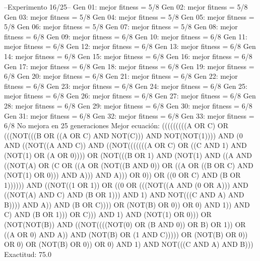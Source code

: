 --Experimento 
 16/25--
Gen 01: mejor fitness = 5/8
Gen 02: mejor fitness = 5/8
Gen 03: mejor fitness = 5/8
Gen 04: mejor fitness = 5/8
Gen 05: mejor fitness = 5/8
Gen 06: mejor fitness = 5/8
Gen 07: mejor fitness = 5/8
Gen 08: mejor fitness = 6/8
Gen 09: mejor fitness = 6/8
Gen 10: mejor fitness = 6/8
Gen 11: mejor fitness = 6/8
Gen 12: mejor fitness = 6/8
Gen 13: mejor fitness = 6/8
Gen 14: mejor fitness = 6/8
Gen 15: mejor fitness = 6/8
Gen 16: mejor fitness = 6/8
Gen 17: mejor fitness = 6/8
Gen 18: mejor fitness = 6/8
Gen 19: mejor fitness = 6/8
Gen 20: mejor fitness = 6/8
Gen 21: mejor fitness = 6/8
Gen 22: mejor fitness = 6/8
Gen 23: mejor fitness = 6/8
Gen 24: mejor fitness = 6/8
Gen 25: mejor fitness = 6/8
Gen 26: mejor fitness = 6/8
Gen 27: mejor fitness = 6/8
Gen 28: mejor fitness = 6/8
Gen 29: mejor fitness = 6/8
Gen 30: mejor fitness = 6/8
Gen 31: mejor fitness = 6/8
Gen 32: mejor fitness = 6/8
Gen 33: mejor fitness = 6/8
No mejora en 25 generaciones
Mejor ecuación: (((((((((A OR C) OR (((NOT(((B OR ((A OR C) AND NOT(C))) AND NOT(NOT(1)))) AND (0 AND ((NOT((A AND C)) AND ((NOT(((((((A OR C) OR ((C AND 1) AND (NOT(1) OR (A OR 0)))) OR (NOT(((B OR 1) AND (NOT(1) AND ((A AND ((NOT(A) OR (C OR ((A OR (NOT((B AND 0)) OR ((A OR ((B OR C) AND (NOT(1) OR 0))) AND A))) AND A))) OR 0)) OR ((0 OR C) AND (B OR 1)))))) AND ((NOT((1 OR 1)) OR ((0 OR (((NOT((A AND (0 OR A))) AND ((NOT(A) AND C) AND (B OR 1))) AND 1) AND NOT(((C AND A) AND B)))) AND A)) AND (B OR C)))) OR (NOT(B) OR 0)) OR 0) AND 1)) AND C) AND (B OR 1))) OR C))) AND 1) AND (NOT(1) OR 0))) OR (NOT(NOT(B)) AND ((NOT((((NOT(0) OR (B AND 0)) OR B) OR 1)) OR ((A OR 0) AND A)) AND (NOT(B) OR (1 AND C))))) OR (NOT(B) OR 0)) OR 0) OR (NOT(B) OR 0)) OR 0) AND 1) AND NOT(((C AND A) AND B)))
 Exactitud: 75.0%

